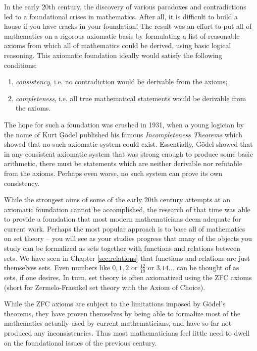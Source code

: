 In the early 20th century, the discovery of various paradoxes and contradictions led to a foundational crises in mathematics. After all, it is difficult to build a house if you have cracks in your foundation! The result was an effort to put all of mathematics on a rigorous axiomatic basis by formulating a list of reasonable axioms from which all of mathematics could be derived, using basic logical reasoning. This axiomatic foundation ideally would satisfy the following conditions:
\begin{enumerate}
    \item \emph{consistency}, i.e. no contradiction would be derivable from the axioms;
    \item \emph{completeness}, i.e. all true mathematical statements would be derivable from the axioms.
\end{enumerate}
The hope for such a foundation was crushed in 1931, when a young logician by the name of Kurt G\"odel published his famous \emph{Incompleteness Theorems} which showed that no such axiomatic system could exist. Essentially, G\"odel showed that in any consistent axiomatic system that was strong enough to produce some basic arithmetic, there must be statements which are neither derivable nor refutable from the axioms. Perhaps even worse, no such system can prove its own consistency.

While the strongest aims of some of the early 20th century attempts at an axiomatic foundation cannot be accomplished, the research of that time was able to provide a foundation that most modern mathematicians deem adequate for current work. Perhaps the most popular approach is to base all of mathematics on set theory -- you will see as your studies progress that many of the objects you study can be formalized as sets together with functions and relations between sets. We have seen in Chapter \ref{sec:relations} that functions and relations are just themselves sets. Even numbers like $0,1,2$ or $\frac{12}{19}$ or $3.14\ldots$ can be thought of as sets, if one desires. In turn, set theory is often axiomatized using the \textrm{ZFC} axioms (short for Zermelo-Fraenkel set theory with the Axiom of Choice). 

While the \textrm{ZFC} axioms are subject to the limitations imposed by G\"odel's theorems, they have proven themselves by being able to formalize most of the mathematics actually used by current mathematicians, and have so far not produced any inconsistencies. Thus most mathematicians feel little need to dwell on the foundational issues of the previous century.






